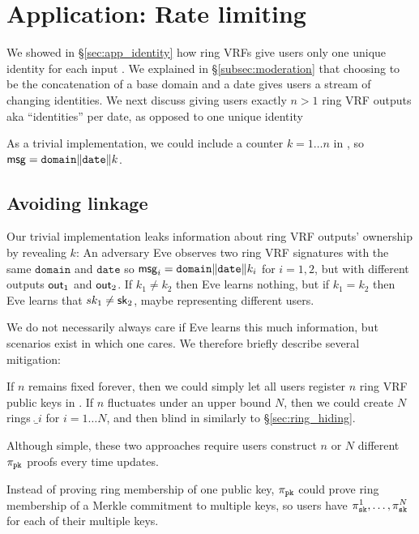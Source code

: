 \section{Application: Rate limiting}
\label{sec:app_rate_limits}

We showed in \S\ref{sec:app_identity} how ring VRFs give users only
one unique identity for each input \msg.  
We explained in \S\ref{subsec:moderation} that choosing \msg to be
the concatenation of a base domain and a date gives users a stream of changing identities.
%
We next discuss giving users exactly $n > 1$ ring VRF outputs aka
``identities'' per date, as opposed to one unique identity 



As a trivial implementation, we could include a counter $k = 1 \ldots n$
in \msg, so $\mathsf{msg} = \mathtt{domain} \| \mathtt{date} \| k$.


\subsection{Avoiding linkage}

Our trivial implementation leaks information about ring VRF outputs'
 ownership by revealing $k$:
%
An adversary Eve observes two ring VRF signatures with the same
$\mathtt{domain}$ and $\mathtt{date}$ so
$\mathsf{msg}_i = \mathtt{domain} \| \mathtt{date} \| k_i$
for $i=1,2$, but with different outputs ${\mathsf{out}}_1$ and ${\mathsf{out}}_2$.
If $k_1 \ne k_2$ then Eve learns nothing, but if $k_1 = k_2$ then
 Eve learns that $sk_1 \ne \mathsf{sk}_2$, maybe representing different users. 

We do not necessarily always care if Eve learns this much information,
but scenarios exist in which one cares.  We therefore briefly describe
several mitigation:

If $n$ remains fixed forever, then we could simply let all users
register $n$ ring VRF public keys in \ring.
If $n$ fluctuates under an upper bound $N$, then we could create $N$
rings $\ring_i$ for $i = 1 \ldots N$, and
 then blind \comring in \pifast similarly to \S\ref{sec:ring_hiding}.

Although simple, these two approaches require users construct $n$ or $N$
different $\pi_{\mathtt{pk}}$ proofs every time \ring updates.

Instead of proving ring membership of one public key, $\pi_{\mathtt{pk}}$ could
prove ring membership of a Merkle commitment to multiple keys, so
users have $\pi_{\mathtt{sk}}^1,\ldots,\pi_{\mathtt{sk}}^N$ for each of their multiple keys.

